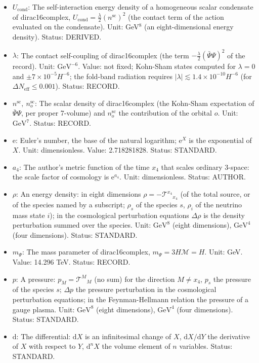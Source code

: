 \documentclass[
  10pt,
]{article}
\providecommand{\tightlist}{%
  \setlength{\itemsep}{0pt}\setlength{\parskip}{0pt}}
\begin{document}
\begin{itemize}
\tightlist
\item
  \(U_{\mathrm{cond}}\): The self-interaction energy density of a
  homogeneous scalar condensate of dirac16complex,
  \(U_{\mathrm{cond}} = \frac{\lambda}{2}(n^{\mathrm{sc}})^2\) (the
  contact term of the action evaluated on the condensate). Unit:
  GeV\(^8\) (an eight-dimensional energy density). Status: DERIVED.
\item
  \(\lambda\): The contact self-coupling of dirac16complex (the term
  \(-\frac{\lambda}{2}(\bar\Psi\Psi)^2\) of the record). Unit:
  \(\mathrm{GeV}^{-6}\). Value: not fixed; Kohn-Sham states computed for
  \(\lambda = 0\) and \(\pm7\times10^{-5}H^{-6}\); the fold-band
  radiation requires
  \(\lvert\lambda\rvert \lesssim 1.4\times10^{-10}H^{-6}\) (for
  \(\Delta N_{\mathrm{eff}} \le 0.001\)). Status: RECORD.
\item
  \(n^{\mathrm{sc}},\ n^{\mathrm{sc}}_o\): The scalar density of
  dirac16complex (the Kohn-Sham expectation of \(\bar\Psi\Psi\), per
  proper 7-volume) and \(n^{\mathrm{sc}}_o\) the contribution of the
  orbital \(o\). Unit: \(\mathrm{GeV}^{7}\). Status: RECORD.
\item
  \(\mathrm{e}\): Euler's number, the base of the natural logarithm;
  \(\mathrm{e}^{X}\) is the exponential of \(X\). Unit: dimensionless.
  Value: 2.718281828. Status: STANDARD.
\item
  \(a_4\): The author's metric function of the time \(x_4\) that scales
  ordinary 3-space: the scale factor of cosmology is
  \(\mathrm{e}^{a_4}\). Unit: dimensionless. Status: AUTHOR.
\item
  \(\rho\): An energy density: in eight dimensions
  \(\rho = -\mathcal{T}^{x_4}{}_{x_4}\) (of the total source, or of the
  species named by a subscript; \(\rho_s\) of the species \(s\),
  \(\rho_i\) of the neutrino mass state \(i\)); in the cosmological
  perturbation equations \(\Delta\rho\) is the density perturbation
  summed over the species. Unit: \(\mathrm{GeV}^{8}\) (eight
  dimensions), \(\mathrm{GeV}^{4}\) (four dimensions). Status: STANDARD.
\item
  \(m_\Psi\): The mass parameter of dirac16complex,
  \(m_\Psi = 3H\mathcal{M} = H\). Unit: GeV. Value: 14.296 TeV. Status:
  RECORD.
\item
  \(p\): A pressure: \(p_M = \mathcal{T}^M{}_M\) (no sum) for the
  direction \(M \ne x_4\), \(p_s\) the pressure of the species \(s\);
  \(\Delta p\) the pressure perturbation in the cosmological
  perturbation equations; in the Feynman-Hellmann relation the pressure
  of a gauge plasma. Unit: \(\mathrm{GeV}^{8}\) (eight dimensions),
  \(\mathrm{GeV}^{4}\) (four dimensions). Status: STANDARD.
\item
  \(\mathrm{d}\): The differential: \(\mathrm{d}X\) is an infinitesimal
  change of \(X\), \(\mathrm{d}X/\mathrm{d}Y\) the derivative of \(X\)
  with respect to \(Y\), \(\mathrm{d}^nX\) the volume element of \(n\)
  variables. Status: STANDARD.
\end{itemize}
\end{document}

